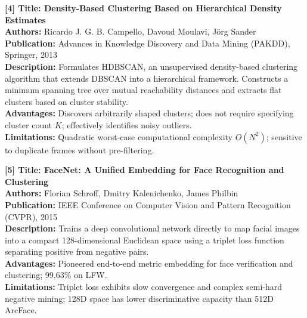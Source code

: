 \vspace{0.15in}
\begin{flushleft}
{\fontsize{12pt}{14pt}\selectfont \textbf{[4] Title: Density-Based Clustering Based on Hierarchical Density Estimates}} \\
\textbf{Authors:} Ricardo J. G. B. Campello, Davoud Moulavi, J{\"o}rg Sander \\
\textbf{Publication:} Advances in Knowledge Discovery and Data Mining (PAKDD), Springer, 2013 \\
\textbf{Description:} Formulates HDBSCAN, an unsupervised density-based clustering algorithm that extends DBSCAN into a hierarchical framework. Constructs a minimum spanning tree over mutual reachability distances and extracts flat clusters based on cluster stability. \\
\textbf{Advantages:} Discovers arbitrarily shaped clusters; does not require specifying cluster count $K$; effectively identifies noisy outliers. \\
\textbf{Limitations:} Quadratic worst-case computational complexity $O(N^2)$; sensitive to duplicate frames without pre-filtering.
\end{flushleft}

\vspace{0.15in}
\begin{flushleft}
{\fontsize{12pt}{14pt}\selectfont \textbf{[5] Title: FaceNet: A Unified Embedding for Face Recognition and Clustering}} \\
\textbf{Authors:} Florian Schroff, Dmitry Kalenichenko, James Philbin \\
\textbf{Publication:} IEEE Conference on Computer Vision and Pattern Recognition (CVPR), 2015 \\
\textbf{Description:} Trains a deep convolutional network directly to map facial images into a compact 128-dimensional Euclidean space using a triplet loss function separating positive from negative pairs. \\
\textbf{Advantages:} Pioneered end-to-end metric embedding for face verification and clustering; 99.63\% on LFW. \\
\textbf{Limitations:} Triplet loss exhibits slow convergence and complex semi-hard negative mining; 128D space has lower discriminative capacity than 512D ArcFace.
\end{flushleft}

